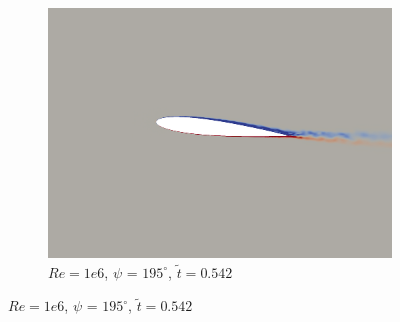 \begin{figure}[H]
\begin{subfigure}[b]{0.32\textwidth}
		\centering
		\includegraphics[width=1\textwidth]{figures/Vorticity_plots/Re_1m_1pt0/phase_195.png}
		\caption{$Re= 1e6$, $\psi$ = $195^\circ$, $\tilde{t}=0.542$}
		\label{fig:Re_1m_1pt0_phi195}
	\end{subfigure}
	

\end{figure}
